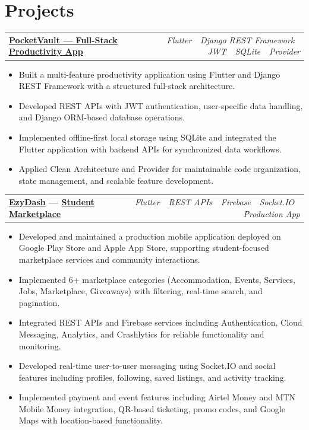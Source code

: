 \documentclass[10.5pt, a4paper]{article}
\makeatletter
\newcommand{\projentry}[2]{%
  \vspace{3pt}%
  \begin{tabularx}{\linewidth}{@{}X r@{}}
    \textbf{#1} & {\small\itshape\color{csteel}#2}
  \end{tabularx}%
  \vspace{1pt}%
}
\makeatother
\begin{document}
\newpage
\section{Projects}

\projentry{\href{https://github.com/SaidurRahman1004/pocketvault}{PocketVault --- Full-Stack Productivity App}}{Flutter \,\textbullet\, Django REST Framework \,\textbullet\, JWT \,\textbullet\, SQLite \,\textbullet\, Provider}
\begin{itemize}
  \item Built a multi-feature productivity application using Flutter and Django REST Framework with a structured full-stack architecture.
  \item Developed REST APIs with JWT authentication, user-specific data handling, and Django ORM-based database operations.
  \item Implemented offline-first local storage using SQLite and integrated the Flutter application with backend APIs for synchronized data workflows.
  \item Applied Clean Architecture and Provider for maintainable code organization, state management, and scalable feature development.
\end{itemize}

\vspace{4pt}

\projentry{\href{https://play.google.com/store/apps/details?id=com.ezydash\&hl=en}{EzyDash} --- \href{https://apps.apple.com/in/app/ezydash-student-marketplace/id6749002165}{Student Marketplace}}{Flutter \,\textbullet\, REST APIs \,\textbullet\, Firebase \,\textbullet\, Socket.IO \,\textbullet\, Production App}
\begin{itemize}
  \item Developed and maintained a production mobile application deployed on Google Play Store and Apple App Store, supporting student-focused marketplace services and community interactions.
  \item Implemented 6+ marketplace categories (Accommodation, Events, Services, Jobs, Marketplace, Giveaways) with filtering, real-time search, and pagination.
  \item Integrated REST APIs and Firebase services including Authentication, Cloud Messaging, Analytics, and Crashlytics for reliable functionality and monitoring.
  \item Developed real-time user-to-user messaging using Socket.IO and social features including profiles, following, saved listings, and activity tracking.
  \item Implemented payment and event features including Airtel Money and MTN Mobile Money integration, QR-based ticketing, promo codes, and Google Maps with location-based functionality.
\end{itemize}
\end{document}
